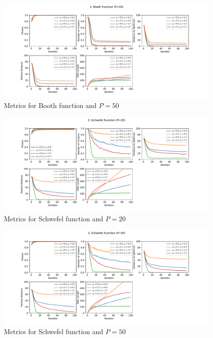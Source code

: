 \documentclass[12pt]{article}
\begin{document}
\begin{figure}[h!]
	\centering
	\includegraphics[width=1\textwidth]{figures/ex4/ex4-2-50.pdf}
	\caption{Metrics for Booth function and $P=50$}
	\label{fig:ex4-2-50}
\end{figure}
\begin{figure}[h!]
	\centering
	\includegraphics[width=1\textwidth]{figures/ex4/ex4-3-20.pdf}
	\caption{Metrics for Schwefel function and $P=20$}
	\label{fig:ex4-3-20}
\end{figure}
\begin{figure}[h!]
	\centering
	\includegraphics[width=1\textwidth]{figures/ex4/ex4-3-50.pdf}
	\caption{Metrics for Schwefel function and $P=50$}
	\label{fig:ex4-3-50}
\end{figure}
\end{document}
